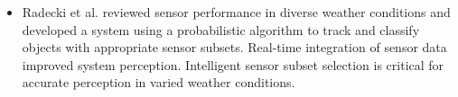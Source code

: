\documentclass[rnd]{mas_proposal}
\begin{document}
\begin{itemize}
      
      \item Radecki et al. \cite{radecki2016all} reviewed sensor performance in diverse weather conditions and developed a system using a probabilistic algorithm to track and classify objects with appropriate sensor subsets. Real-time integration of sensor data improved system perception. Intelligent sensor subset selection is critical for accurate perception in varied weather conditions.
      

\end{itemize}
\end{document}
